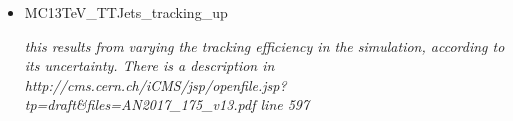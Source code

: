 \documentclass{article}
\begin{document}
\begin{itemize}
{\it these are variations of the b-tagging efficiency uncertainty for heavy (b or c) or light (udsg) jets.}

\item MC13TeV\_TTJets\_tracking\_up

{\it this results from varying the tracking efficiency in the simulation, according to its uncertainty. There is a description in http://cms.cern.ch/iCMS/jsp/openfile.jsp?tp=draft&files=AN2017_175_v13.pdf line 597}

\end{itemize}
\end{document}
